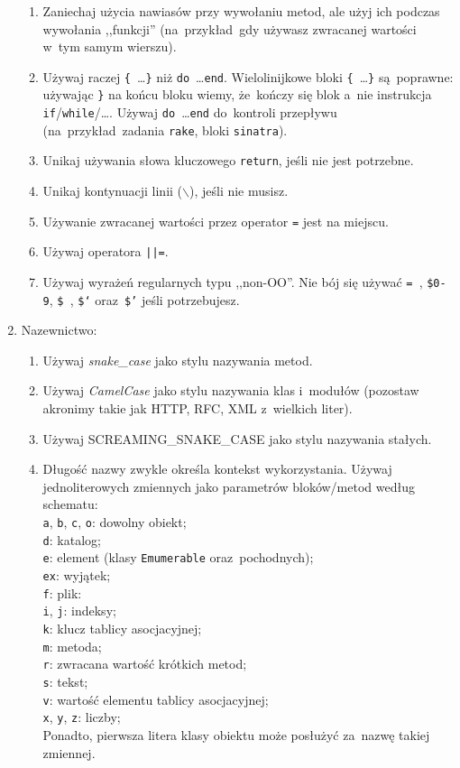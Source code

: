 \begin{enumerate}
\begin{enumerate}
    \item Zaniechaj użycia nawiasów przy wywołaniu metod, ale użyj ich podczas wywołania ,,funkcji'' (na~przykład~gdy używasz zwracanej wartości w~tym samym wierszu).
    \item Używaj raczej \mbox{\texttt{\{} \ldots \texttt{\}}} niż \mbox{\texttt{do} \ldots \texttt{end}}. Wielolinijkowe bloki \mbox{\texttt{\{} \ldots \texttt{\}}} są~poprawne: używając \texttt{\}} na końcu bloku wiemy, że~kończy się blok a~nie instrukcja \texttt{if}/\texttt{while}/\ldots. Używaj \mbox{\texttt{do} \ldots \texttt{end}} do~kontroli przepływu (na~przykład~zadania \texttt{rake}, bloki \texttt{sinatra}).
    \item Unikaj używania słowa kluczowego \texttt{return}, jeśli nie jest potrzebne.
    \item Unikaj kontynuacji linii (\texttt{$ \backslash $}), jeśli nie musisz.
    \item Używanie zwracanej wartości przez operator \texttt{=} jest na miejscu.
    \item Używaj operatora \texttt{||=}.
    \item Używaj wyrażeń regularnych typu ,,non-OO''.  Nie bój się używać \texttt{=~}, \texttt{\$0-9}, \texttt{\$~}, \texttt{\$`} oraz~\texttt{\$'} jeśli potrzebujesz.
  \end{enumerate}
  \item Nazewnictwo:
  \begin{enumerate}
    \item Używaj \textit{snake\_case} jako stylu nazywania metod.
    \item Używaj \textit{CamelCase} jako stylu nazywania klas i~modułów (pozostaw akronimy takie jak HTTP, RFC, XML z~wielkich liter).
    \item Używaj SCREAMING\_SNAKE\_CASE jako stylu nazywania stałych.
    \item Długość nazwy zwykle określa kontekst wykorzystania. Używaj jednoliterowych zmiennych jako parametrów bloków/metod według schematu:\\
      \texttt{a}, \texttt{b}, \texttt{c}, \texttt{o}: dowolny obiekt;\\
      \texttt{d}: katalog;\\
      \texttt{e}: element (klasy \texttt{Emumerable} oraz~pochodnych);\\
      \texttt{ex}: wyjątek;\\
      \texttt{f}: plik:\\
      \texttt{i}, \texttt{j}: indeksy;\\
      \texttt{k}: klucz tablicy asocjacyjnej;\\
      \texttt{m}: metoda;\\
      \texttt{r}: zwracana wartość krótkich metod;\\
      \texttt{s}: tekst;\\
      \texttt{v}: wartość elementu tablicy asocjacyjnej;\\
      \texttt{x}, \texttt{y}, \texttt{z}: liczby;\\
      Ponadto, pierwsza litera klasy obiektu może posłużyć za~nazwę takiej zmiennej.


\end{enumerate}
\end{enumerate}
